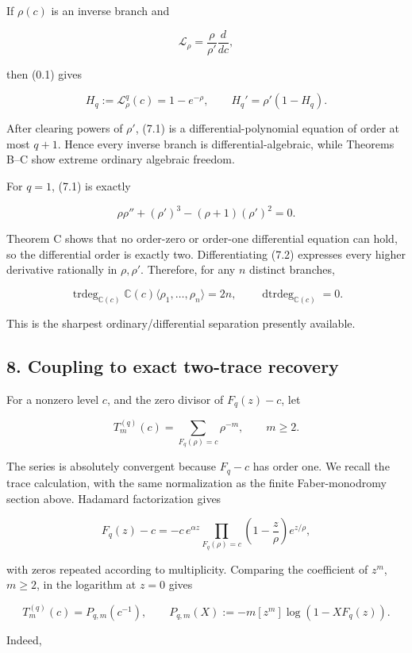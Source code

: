 \documentclass[11pt]{article}
\theoremstyle{keio}
\theoremstyle{definition}
\theoremstyle{remark}
\begin{document}
If \(\rho(c)\) is an inverse branch and

\[
 \mathcal L_\rho=\frac{\rho}{\rho'}\frac d{dc},
\]

then (0.1) gives

\[
 H_q:=\mathcal L_\rho^q(c)=1-e^{-\rho},\qquad
 H_q'=\rho'(1-H_q).
\tag{Inv-7.1}
\]

After clearing powers of \(\rho'\), (7.1) is a differential-polynomial
equation of order at most \(q+1\). Hence every inverse branch is
differential-algebraic, while Theorems B--C show extreme ordinary algebraic
freedom.

For \(q=1\), (7.1) is exactly

\[
 \rho\rho''+(\rho')^3-(\rho+1)(\rho')^2=0.
\tag{Inv-7.2}
\]

Theorem C shows that no order-zero or order-one differential equation can
hold, so the differential order is exactly two. Differentiating (7.2)
expresses every higher derivative rationally in \(\rho,\rho'\). Therefore,
for any \(n\) distinct branches,

\[
 \operatorname{trdeg}_{\mathbb C(c)}
 \mathbb C(c)\langle\rho_1,\ldots,\rho_n\rangle=2n,
 \qquad
 \operatorname{dtrdeg}_{\mathbb C(c)}=0.
\tag{Inv-7.3}
\]

This is the sharpest ordinary/differential separation presently available.

\subsection{8. Coupling to exact two-trace recovery}

For a nonzero level \(c\), and the zero divisor of \(F_q(z)-c\), let

\[
 T_m^{(q)}(c)=\sum_{F_q(\rho)=c}\rho^{-m},\qquad m\geq2.
\]

The series is absolutely convergent because \(F_q-c\) has order one. We
recall the trace calculation, with the same normalization as the finite
Faber-monodromy section above. Hadamard factorization gives

\[
 F_q(z)-c=-c\,e^{\alpha z}
 \prod_{F_q(\rho)=c}\left(1-\frac z\rho\right)e^{z/\rho},
\]

with zeros repeated according to multiplicity. Comparing the coefficient
of \(z^m\), \(m\geq2\), in the logarithm at \(z=0\) gives

\[
 T_m^{(q)}(c)=P_{q,m}(c^{-1}),\qquad
 P_{q,m}(X):=-m[z^m]\log(1-XF_q(z)).
\tag{Inv-8.0}
\]

Indeed,
\end{document}
